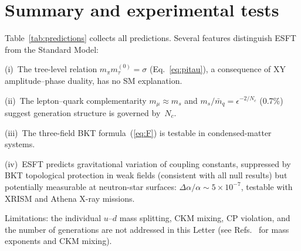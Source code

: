 ﻿\documentclass[aps,prl,twocolumn,superscriptaddress,showpacs]{revtex4-2}
\begin{document}
\section{Summary and experimental tests}

Table~\ref{tab:predictions} collects all predictions. Several
features distinguish ESFT from the Standard Model:

(i)~The tree-level relation $m_\pi m_\tau^{(0)} = \sigma$
(Eq.~\ref{eq:pitau}), a consequence of XY amplitude--phase duality,
has no SM explanation.

(ii)~The lepton--quark complementarity $m_\mu \approx m_s$ and
$m_s/\bar{m}_q = \epsilon^{-2/N_c}$ (0.7\%) suggest generation
structure is governed by~$N_c$.

(iii)~The three-field BKT formula~(\ref{eq:F}) is testable in
condensed-matter systems.

(iv)~ESFT predicts gravitational variation of coupling constants,
suppressed by BKT topological protection in weak fields (consistent
with all null results) but potentially measurable at neutron-star
surfaces: $\Delta\alpha/\alpha \sim 5\times10^{-7}$, testable with
XRISM and Athena X-ray missions.

Limitations: the individual $u$--$d$ mass splitting, CKM mixing, CP
violation, and the number of generations are not addressed in this
Letter (see Refs.~\cite{PaperVII} for mass exponents and CKM
mixing).
\end{document}
